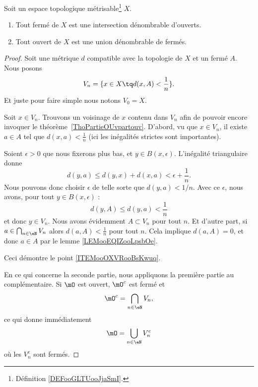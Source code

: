\begin{proposition}      \label{PROPooXWBTooCvGLOj}
	Soit un espace topologique métrisable\footnote{Définition \ref{DEFooGLTUooJjaSmI}.} \( X\).
	\begin{enumerate}
		\item   \label{ITEMooOXVRooBsKwuq}
		      Tout fermé de \( X\) est une intersection dénombrable d'ouverts.
		\item
		      Tout ouvert de \( X\) est une union dénombrable de fermés.
	\end{enumerate}
\end{proposition}

\begin{proof}
	Soit une métrique \( d\) compatible avec la topologie de \( X\) et un fermé \( A\). Nous posons
	\begin{equation}
		V_n=\{ x\in X\tq d(x,A)<\frac{1}{ n } \}.
	\end{equation}
	Et juste pour faire simple nous notons \( V_0=X\).
	\begin{subproof}
		Soit \( x\in V_n\). Trouvons un voisinage de \( x\) contenu dans \( V_n\) afin de pouvoir encore invoquer le théorème~\ref{ThoPartieOUvpartouv}. D'abord, vu que \( x\in V_n\), il existe \( a\in A\) tel que \( d(x,a)<\frac{ 1 }{ n }\) (ici les inégalités strictes sont importantes).

		Soient \( \epsilon>0\) que nous fixerons plus bas, et \( y\in B(x,\epsilon)\). L'inégalité triangulaire donne
		\begin{equation}
			d(y,a)\leq d(y,x)+d(x,a)<\epsilon+\frac{1}{ n }.
		\end{equation}
		Nous pouvons donc choisir \( \epsilon\) de telle sorte que \( d(y,a)<1/n\). Avec ce \( \epsilon\), nous avons, pour tout \( y\in B(x,\epsilon)\) :
		\begin{equation}
			d(y,A)\leq d(y,a)<\frac{1}{ n }
		\end{equation}
		et donc \( y\in V_n\).
		Nous avons évidemment \( A\subset V_n\) pour tout \( n\). Et d'autre part, si \( a\in\bigcap_{n\in \eN} V_n\) alors \( d(a,A)<\frac{1}{ n }\) pour tout \( n\). Cela implique \( d(a,A)=0\), et donc \( a\in A\) par le lemme \ref{LEMooEQIZooLpsbOe}.
	\end{subproof}

	Ceci démontre le point \ref{ITEMooOXVRooBsKwuq}.

	En ce qui concerne la seconde partie, nous appliquons la première partie au complémentaire. Si \( \mO\) est ouvert, \( \mO^c\) est fermé et
	\begin{equation}
		\mO^c=\bigcap_{n\in \eN}V_n,
	\end{equation}
	ce qui donne immédiatement
	\begin{equation}
		\mO=\bigcup_{n\in \eN}V_n^c
	\end{equation}
	où les \( V_n^c\) sont fermés.
\end{proof}

